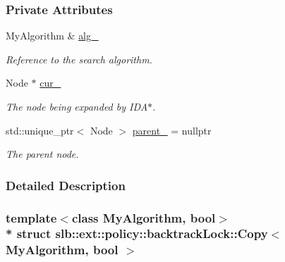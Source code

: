 \subsubsection*{Private Attributes}
\begin{DoxyCompactItemize}
\item 
My\+Algorithm \& \hyperlink{structslb_1_1ext_1_1policy_1_1backtrackLock_1_1Copy_a36c0320dc90b67be932e13a68f757fc0}{alg\+\_\+}\hypertarget{structslb_1_1ext_1_1policy_1_1backtrackLock_1_1Copy_a36c0320dc90b67be932e13a68f757fc0}{}\label{structslb_1_1ext_1_1policy_1_1backtrackLock_1_1Copy_a36c0320dc90b67be932e13a68f757fc0}

\begin{DoxyCompactList}\small\item\em Reference to the search algorithm. \end{DoxyCompactList}\item 
Node $\ast$ \hyperlink{structslb_1_1ext_1_1policy_1_1backtrackLock_1_1Copy_a993039d467285276adef0dca841f2f8c}{cur\+\_\+}\hypertarget{structslb_1_1ext_1_1policy_1_1backtrackLock_1_1Copy_a993039d467285276adef0dca841f2f8c}{}\label{structslb_1_1ext_1_1policy_1_1backtrackLock_1_1Copy_a993039d467285276adef0dca841f2f8c}

\begin{DoxyCompactList}\small\item\em The node being expanded by I\+D\+A$\ast$. \end{DoxyCompactList}\item 
std\+::unique\+\_\+ptr$<$ Node $>$ \hyperlink{structslb_1_1ext_1_1policy_1_1backtrackLock_1_1Copy_a656073f2a1b58f5c7972dd540b06ef2c}{parent\+\_\+} = nullptr\hypertarget{structslb_1_1ext_1_1policy_1_1backtrackLock_1_1Copy_a656073f2a1b58f5c7972dd540b06ef2c}{}\label{structslb_1_1ext_1_1policy_1_1backtrackLock_1_1Copy_a656073f2a1b58f5c7972dd540b06ef2c}

\begin{DoxyCompactList}\small\item\em The parent node. \end{DoxyCompactList}\end{DoxyCompactItemize}


\subsubsection{Detailed Description}
\subsubsection*{template$<$class My\+Algorithm, bool$>$\\*
struct slb\+::ext\+::policy\+::backtrack\+Lock\+::\+Copy$<$ My\+Algorithm, bool $>$}


